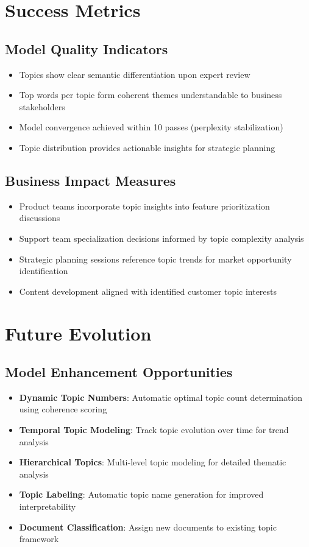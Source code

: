 \documentclass[11pt]{article}
\begin{document}
\section{Success Metrics}

\subsection{Model Quality Indicators}
\begin{itemize}
\item Topics show clear semantic differentiation upon expert review
\item Top words per topic form coherent themes understandable to business stakeholders
\item Model convergence achieved within 10 passes (perplexity stabilization)
\item Topic distribution provides actionable insights for strategic planning
\end{itemize}

\subsection{Business Impact Measures}
\begin{itemize}
\item Product teams incorporate topic insights into feature prioritization discussions
\item Support team specialization decisions informed by topic complexity analysis
\item Strategic planning sessions reference topic trends for market opportunity identification
\item Content development aligned with identified customer topic interests
\end{itemize}

\section{Future Evolution}

\subsection{Model Enhancement Opportunities}
\begin{itemize}
\item \textbf{Dynamic Topic Numbers}: Automatic optimal topic count determination using coherence scoring
\item \textbf{Temporal Topic Modeling}: Track topic evolution over time for trend analysis
\item \textbf{Hierarchical Topics}: Multi-level topic modeling for detailed thematic analysis
\item \textbf{Topic Labeling}: Automatic topic name generation for improved interpretability
\item \textbf{Document Classification}: Assign new documents to existing topic framework
\end{itemize}
\end{document}

